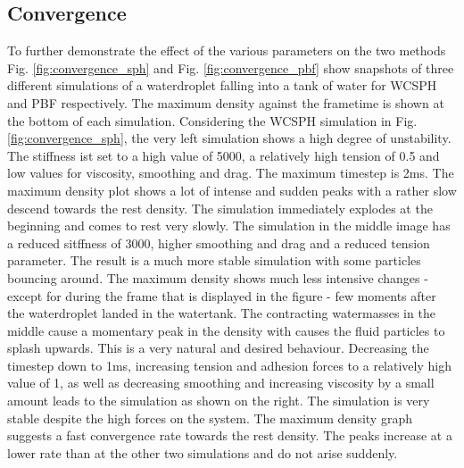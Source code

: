 \documentclass[11pt, letterpaper, twocolumn]{article}
\begin{document}
\subsection{Convergence}
\label{subsec:convergence}

To further demonstrate the effect of the various parameters on the two methods Fig. \ref{fig:convergence_sph} and Fig. \ref{fig:convergence_pbf} show snapshots of three different simulations of a waterdroplet falling into a tank of water for WCSPH and PBF respectively. The maximum density against the frametime is shown at the bottom of each simulation.
Considering the WCSPH simulation in Fig. \ref{fig:convergence_sph}, the very left simulation shows a high degree of unstability. The stiffness ist set to a high value of 5000, a relatively high tension of 0.5 and low values for viscosity, smoothing and drag. The maximum timestep is 2ms. The maximum density plot shows a lot of intense and sudden peaks with a rather slow descend towards the rest density. The simulation immediately explodes at the beginning and comes to rest very slowly.
The simulation in the middle image has a reduced sitffness of 3000, higher smoothing and drag and a reduced tension parameter. The result is a much more stable simulation with some particles bouncing around. The maximum density shows much less intensive changes - except for during the frame that is displayed in the figure - few moments after the waterdroplet landed in the watertank. The contracting watermasses in the middle cause a momentary peak in the density with causes the fluid particles to splash upwards. This is a very natural and desired behaviour. Decreasing the timestep down to 1ms, increasing tension and adhesion forces to a relatively high value of 1, as well as decreasing smoothing and increasing viscosity by a small amount leads to the simulation as shown on the right. The simulation is very stable despite the high forces on the system. The maximum density graph suggests a fast convergence rate towards the rest density. The peaks increase at a lower rate than at the other two simulations and do not arise suddenly.
\end{document}
